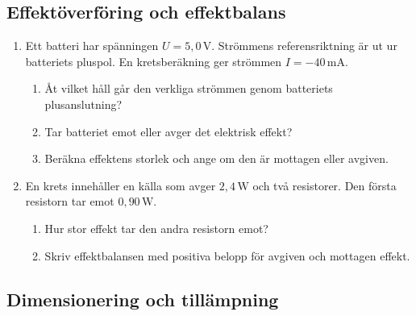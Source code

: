 \documentclass[
  swedish,
  11pt,
  a4paper,
  DIV=11,
  numbers=noendperiod,
  twoside,
  open=any]{scrreprt}
\begin{document}
\subsection{Effektöverföring och
effektbalans}\label{sec-effekt-tecken-och-effektbalans}

\begin{enumerate}
\def\labelenumi{\arabic{enumi}.}
\setcounter{enumi}{12}
\item
  Ett batteri har spänningen \(U = 5{,}0\,\mathrm{V}\). Strömmens
  referensriktning är ut ur batteriets pluspol. En kretsberäkning ger
  strömmen \(I = -40\,\mathrm{mA}\).

  \begin{enumerate}
  \def\labelenumii{\alph{enumii}.}
  \item
    Åt vilket håll går den verkliga strömmen genom batteriets
    plusanslutning?
  \item
    Tar batteriet emot eller avger det elektrisk effekt?
  \item
    Beräkna effektens storlek och ange om den är mottagen eller avgiven.
  \end{enumerate}
\item
  En krets innehåller en källa som avger \(2{,}4\,\mathrm{W}\) och två
  resistorer. Den första resistorn tar emot \(0{,}90\,\mathrm{W}\).

  \begin{enumerate}
  \def\labelenumii{\alph{enumii}.}
  \item
    Hur stor effekt tar den andra resistorn emot?
  \item
    Skriv effektbalansen med positiva belopp för avgiven och mottagen
    effekt.
  \end{enumerate}
\end{enumerate}

\subsection{Dimensionering och
tillämpning}\label{sec-effekt-dimensionering-och-tillampning}
\end{document}
